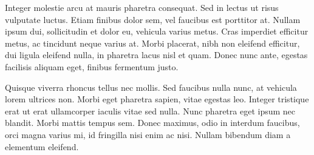 \documentclass[]{article}
\begin{document}
Integer molestie arcu at mauris pharetra consequat. Sed in lectus ut risus vulputate luctus. Etiam finibus dolor sem, vel faucibus est porttitor at. Nullam ipsum dui, sollicitudin et dolor eu, vehicula varius metus. Cras imperdiet efficitur metus, ac tincidunt neque varius at. Morbi placerat, nibh non eleifend efficitur, dui ligula eleifend nulla, in pharetra lacus nisl et quam. Donec nunc ante, egestas facilisis aliquam eget, finibus fermentum justo.

Quisque viverra rhoncus tellus nec mollis. Sed faucibus nulla nunc, at vehicula lorem ultrices non. Morbi eget pharetra sapien, vitae egestas leo. Integer tristique erat ut erat ullamcorper iaculis vitae sed nulla. Nunc pharetra eget ipsum nec blandit. Morbi mattis tempus sem. Donec maximus, odio in interdum faucibus, orci magna varius mi, id fringilla nisi enim ac nisi. Nullam bibendum diam a elementum eleifend.
\end{document}
